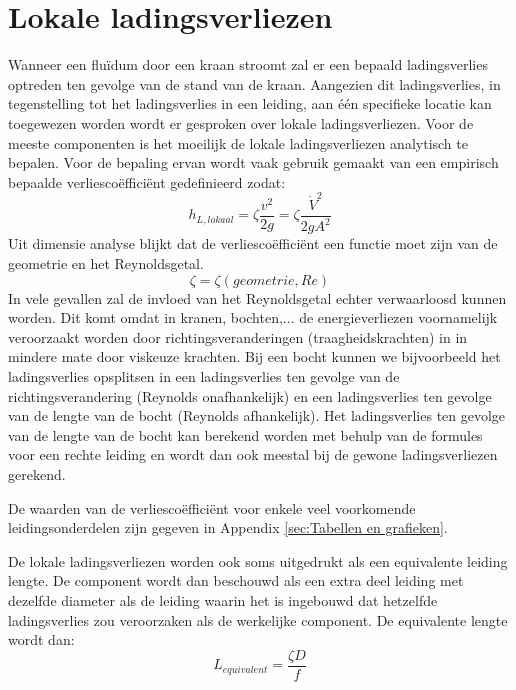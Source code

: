 	\section{Lokale ladingsverliezen}
	\label{sec:Lokale ladingsverliezen}
Wanneer een fluïdum door een kraan stroomt zal er een bepaald ladingsverlies optreden ten gevolge van de stand van de kraan. Aangezien dit ladingsverlies, in tegenstelling tot het ladingsverlies in een leiding, aan één specifieke locatie kan toegewezen worden wordt er gesproken over lokale ladingsverliezen. Voor de meeste componenten is het moeilijk de lokale ladingsverliezen analytisch te bepalen. Voor de bepaling ervan wordt vaak gebruik gemaakt van een empirisch bepaalde verliescoëfficiënt gedefinieerd zodat:
\begin{equation}
	h_{L, lokaal} = \zeta \frac{v^2}{2 g} = \zeta \frac{\dot{V}^2}{2 g A^2}
	\label{eqn:lokale ladingsverliezen}
\end{equation}
Uit dimensie analyse blijkt dat de verliescoëfficiënt een functie moet zijn van de geometrie en het Reynoldsgetal.
\begin{equation}
	\zeta = \zeta(geometrie, Re)
\end{equation}
In vele gevallen zal de invloed van het Reynoldsgetal echter verwaarloosd kunnen worden. Dit komt omdat in kranen, bochten,... de energieverliezen voornamelijk veroorzaakt worden door richtingsveranderingen (traagheidskrachten) in in mindere mate door viskeuze krachten. Bij een bocht kunnen we bijvoorbeeld het ladingsverlies opsplitsen in een ladingsverlies ten gevolge van de richtingsverandering (Reynolds onafhankelijk) en een ladingsverlies ten gevolge van de lengte van de bocht (Reynolds afhankelijk). Het ladingsverlies ten gevolge van de lengte van de bocht kan berekend worden met behulp van de formules voor een rechte leiding en wordt dan ook meestal bij de gewone ladingsverliezen gerekend.

De waarden van de verliescoëfficiënt voor enkele veel voorkomende leidingsonderdelen zijn gegeven in Appendix \ref{sec:Tabellen en grafieken}.

De lokale ladingsverliezen worden ook soms uitgedrukt als een equivalente leiding lengte. De component wordt dan beschouwd als een extra deel leiding met dezelfde diameter als de leiding waarin het is ingebouwd dat hetzelfde ladingsverlies zou veroorzaken als de werkelijke component. De equivalente lengte wordt dan:
\begin{equation}
	L_{equivalent} = \frac{\zeta D}{f}
\end{equation}

